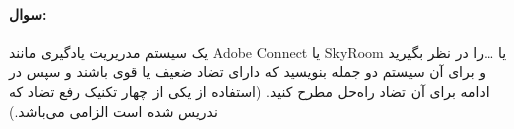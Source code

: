 \documentclass[a4paper,10pt]{article}
\begin{document}
    \paragraph{سوال:} یک سیستم مدریریت یادگیری مانند Adobe Connect یا SkyRoom یا \dots را در نظر بگیرید و برای آن سیستم دو جمله بنویسید که دارای تضاد ضعیف یا قوی باشند و سپس در ادامه برای آن تضاد راه‌حل مطرح کنید. (استفاده از یکی از چهار تکنیک رفع تضاد که ندریس شده است الزامی می‌باشد.)
\end{document}
